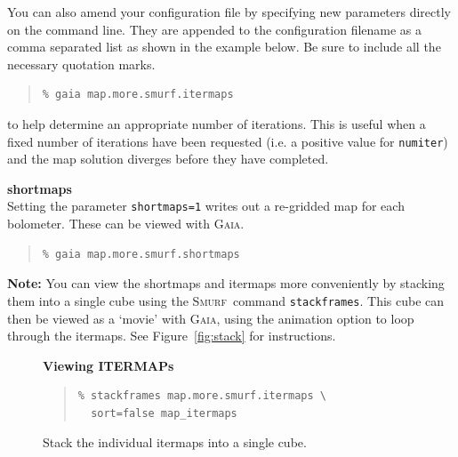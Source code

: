 \documentclass[twoside,11pt]{article}
\newenvironment{latexonly}{}{}
\newcommand{\xref}[3]{#1}
\renewcommand{\_}{\texttt{\symbol{95}}}
\newenvironment{fmpage}[1]{\begin{lrbox}{\fmbox}\begin{minipage}{#1}}{\end{minipage}\end{lrbox}\fbox{\usebox{\fmbox}}}
\newenvironment{myquote}{\begin{quote}\begin{small}}{\end{small}\end{quote}}
\newcommand{\gaia}{\xref{\textsc{Gaia}}{sun214}{}}
\newcommand{\smurf}{\xref{\textsc{Smurf}}{sun258}{}}
\begin{document}
You can also amend your configuration file by specifying new
parameters directly on the command line. They are appended to the
configuration filename as a comma separated list as shown in the
example below. Be sure to include all the necessary quotation marks.

\begin{latexonly}
\begin{myquote}
\begin{verbatim}
% gaia map.more.smurf.itermaps
\end{verbatim}
\end{myquote}
to help determine an appropriate number of iterations. This is useful
when a fixed number of iterations have been requested (i.e. a positive
value for \texttt{numiter}) and the map solution diverges before
they have completed.

\textbf{shortmaps}\\
Setting the parameter \texttt{shortmaps=1} writes out a re-gridded map
for each bolometer. These can be viewed with \gaia.

\begin{myquote}
\begin{verbatim}
% gaia map.more.smurf.shortmaps
\end{verbatim}
\end{myquote}

\textbf{Note:} You can view the shortmaps and itermaps more conveniently by stacking
them into a single cube using the \smurf\ command
\texttt{stackframes}. This cube can then be viewed as a `movie' with
\gaia, using the animation option to loop through the itermaps. See
Figure~\ref{fig:stack} for instructions.

\begin{figure}[ht!]
\begin{center}
\begin{fmpage}{0.95\linewidth}
\vspace{0.2cm}
\hspace{2mm}
\textbf{Viewing ITERMAPs}

\vspace{0.5cm}

\begin{minipage}[c]{0.65\linewidth}

\begin{myquote}
\begin{verbatim}
% stackframes map.more.smurf.itermaps \
  sort=false map_itermaps
\end{verbatim}
\end{myquote}
\end{minipage}
\hspace{0.3cm}
\begin{minipage}[c]{0.29\linewidth}
Stack the individual itermaps into a single cube.
\end{minipage}


\end{fmpage}
\end{center}
\end{figure}
\end{latexonly}
\end{document}

